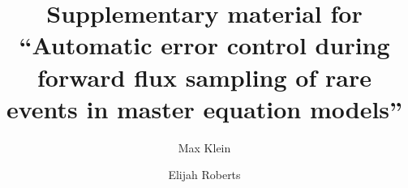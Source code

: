 \documentclass[aip,jcp,preprint]{revtex4-1}
\begin{document}
\title{Supplementary material for ``Automatic error control during forward flux sampling of rare events in master equation models''}
\author{Max Klein}
\author{Elijah Roberts}

\maketitle





%
\footnotesize



\normalsize
\newpage


\newpage

\end{document}
